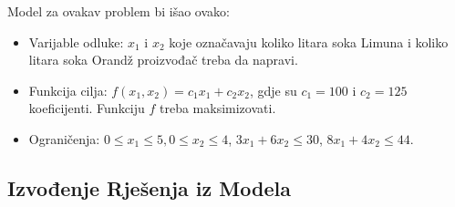 \documentclass[a4paper, utf8, 11pt, colorlinks]{article}
\begin{document}
Model za ovakav problem bi išao ovako:
\begin{itemize}
    \item 
Varijable odluke: $x_1$ i $x_2$ koje označavaju koliko litara soka Limuna i koliko litara soka Orandž proizvođač treba da napravi.  
\item Funkcija cilja: $f(x_1, x_2) = c_1x_1 + c_2 x_2$, gdje su $c_1 = 100$ i  $c_2 = 125$ koeficijenti. Funkciju $f$ treba maksimizovati. \\
\item Ograničenja: $0 \leq x_1 \leq 5, 0 \leq x_2 \leq 4$,   $3 x_1 + 6 x_2 \leq 30$, $8 x_1 + 4 x_2 \leq 44.$
\end{itemize}

\subsection{Izvođenje Rješenja iz Modela}
\end{document}
